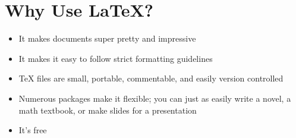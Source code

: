\documentclass[12pt]{article}
\begin{document}
\section{Why Use LaTeX?}
\begin{itemize}
    \item{It makes documents super pretty and impressive}
    \item{It makes it easy to follow strict formatting guidelines}
    \item{TeX files are small, portable, commentable, and easily version controlled}
    \item{Numerous packages make it flexible; you can just as easily write a novel, a math textbook, or make slides for a presentation}
    \item{It's free}
\end{itemize}
\end{document}

